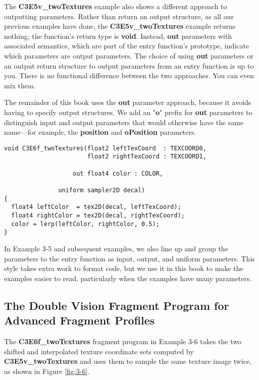 \documentclass[../main.tex]{subfiles}
\begin{document}
The \textbf{C3E5v_twoTextures} example also shows a different approach to outputting parameters. Rather than return an output structure, as all our previous examples have done, the \textbf{C3E5v_twoTextures} example returns nothing; the function's return type is \textbf{void}. Instead, \textbf{out} parameters with associated semantics, which are part of the entry function's prototype, indicate which parameters are output parameters. The choice of using \textbf{out} parameters or an output return structure to output parameters from an entry function is up to you. There is no functional difference between the two approaches. You can even mix them.

The remainder of this book uses the \textbf{out} parameter approach, because it avoids having to specify output structures. We add an "\textbf{o}" prefix for \textbf{out} parameters to distinguish input and output parameters that would otherwise have the same name—for example, the \textbf{position} and \textbf{oPosition} parameters.

\FloatBarrier
\begin{lstlisting}[caption=Example 3-6. The \textbf{C3E6f_twoTextures} Fragment Program]
void C3E6f_twoTextures(float2 leftTexCoord  : TEXCOORD0,
                       float2 rightTexCoord : TEXCOORD1,

                   out float4 color : COLOR,

               uniform sampler2D decal)
{
  float4 leftColor  = tex2D(decal, leftTexCoord);
  float4 rightColor = tex2D(decal, rightTexCoord);
  color = lerp(leftColor, rightColor, 0.5);
}
\end{lstlisting}
\FloatBarrier

In Example 3-5 and subsequent examples, we also line up and group the parameters to the entry function as input, output, and uniform parameters. This style takes extra work to format code, but we use it in this book to make the examples easier to read, particularly when the examples have many parameters.

\subsection*{The Double Vision Fragment Program for Advanced Fragment Profiles}

The \textbf{C3E6f_twoTextures} fragment program in Example 3-6 takes the two shifted and interpolated texture coordinate sets computed by \textbf{C3E5v_twoTextures} and uses them to sample the same texture image twice, as shown in Figure \ref{fig:3-6}.
\end{document}

